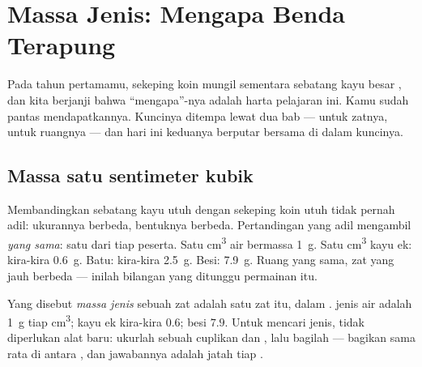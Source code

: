 \chapter{Massa Jenis: Mengapa Benda Terapung}\label{ch:g6:density-floating}

Pada tahun pertamamu, sekeping koin mungil  sementara
sebatang kayu besar , dan kita berjanji bahwa ``mengapa''-nya
adalah harta pelajaran ini. Kamu sudah pantas mendapatkannya. Kuncinya
ditempa lewat dua bab ---  untuk zatnya,  untuk ruangnya
--- dan hari ini keduanya berputar bersama di dalam kuncinya.

\section{Massa satu sentimeter kubik}

\begin{example}\label{ex:g6:density-floating:fair}
Membandingkan sebatang kayu utuh dengan sekeping koin utuh tidak
pernah adil: ukurannya berbeda, bentuknya berbeda. Pertandingan yang
adil mengambil \emph{ yang sama}: satu  dari
tiap peserta. Satu \unit{cm^3} air bermassa \qty{1}{g}. Satu
\unit{cm^3} kayu ek: kira-kira \qty{0.6}{g}. Batu: kira-kira
\qty{2.5}{g}. Besi: \qty{7.9}{g}. Ruang yang sama, zat yang jauh
berbeda --- inilah bilangan yang ditunggu permainan  itu.
\end{example}

\begin{definition}\label{def:g6:density-floating:density}
Yang disebut \emph{massa jenis} sebuah zat adalah
 satu  zat itu, dalam .  jenis air
adalah \qty{1}{g} tiap \unit{cm^3}; kayu ek kira-kira $0.6$; besi
$7.9$. Untuk mencari  jenis, tidak diperlukan alat baru: ukurlah
 sebuah cuplikan dan , lalu bagilah --- bagikan 
sama rata di antara , dan jawabannya adalah jatah
tiap .
\end{definition}

